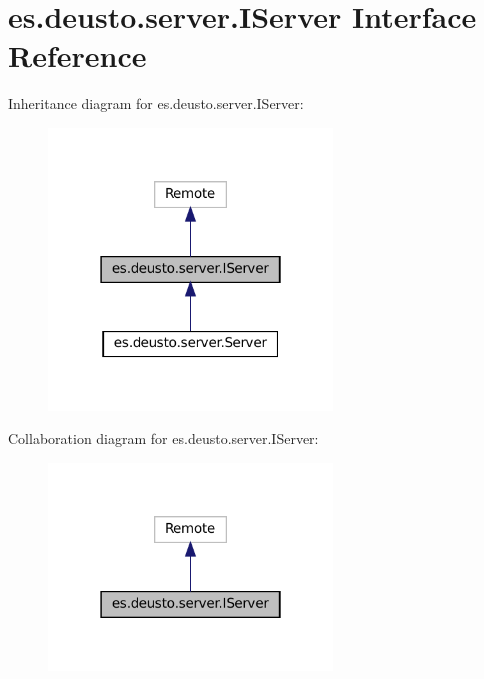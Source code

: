\hypertarget{interfacees_1_1deusto_1_1server_1_1_i_server}{}\section{es.\+deusto.\+server.\+I\+Server Interface Reference}
\label{interfacees_1_1deusto_1_1server_1_1_i_server}


Inheritance diagram for es.\+deusto.\+server.\+I\+Server\+:
\nopagebreak
\begin{figure}[H]
\begin{center}
\leavevmode
\includegraphics[width=214pt]{interfacees_1_1deusto_1_1server_1_1_i_server__inherit__graph}
\end{center}
\end{figure}


Collaboration diagram for es.\+deusto.\+server.\+I\+Server\+:
\nopagebreak
\begin{figure}[H]
\begin{center}
\leavevmode
\includegraphics[width=214pt]{interfacees_1_1deusto_1_1server_1_1_i_server__coll__graph}
\end{center}
\end{figure}
